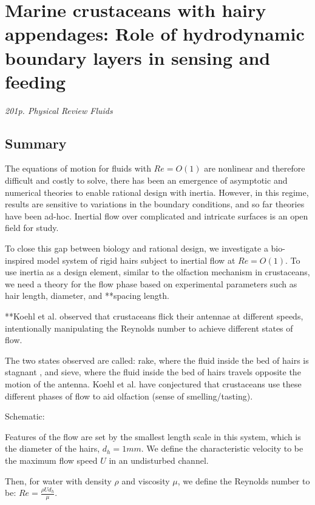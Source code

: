 \documentclass[preprint, letterpaper, nobibnotes, aps, superscriptaddress,prb]{revtex4-1}
\begin{document}
\section{Marine crustaceans with hairy appendages: Role of hydrodynamic boundary layers in sensing and feeding}

\textit{201p. Physical Review Fluids}
\subsection{Summary}
    
The equations of motion for fluids with $Re = O(1)$ are nonlinear and therefore difficult and costly to solve, there has been an emergence of asymptotic and numerical theories to enable rational design with inertia. However, in this regime, results are sensitive to variations in the boundary conditions, and so far theories have been ad-hoc. Inertial flow over complicated and intricate surfaces is an open field for study.

To close this gap between biology and rational design, we investigate a bio-inspired model system of rigid hairs subject to inertial flow at $Re = O(1)$. To use inertia as a design element, similar to the olfaction mechanism in crustaceans, we need a theory for the flow phase based on experimental parameters such as hair length, diameter, and **spacing length.

**Koehl et al. observed that crustaceans flick their antennae at different speeds, intentionally manipulating the Reynolds number to achieve different states of flow. 

The two states observed are called:
rake, where the fluid inside the bed of hairs is stagnant
, and 
sieve, where the fluid inside the bed of hairs travels opposite the motion of the antenna. Koehl et al. have conjectured that crustaceans use these different phases of flow to aid olfaction (sense of smelling/tasting).

Schematic:
\begin{figure}[H]
  \centering {}
  \caption{}\label{fig1}
\end{figure}


Features of the flow are set by the smallest length scale in this system, which is the diameter of the hairs, $d_h = 1 mm$. We define the characteristic velocity to be the maximum flow speed $U$ in an undisturbed channel. 

Then, for water with density $\rho$ and viscosity $\mu$, we define the Reynolds number to be: $Re = \frac{\rho U d_h}{\mu}$. 
\end{document}
